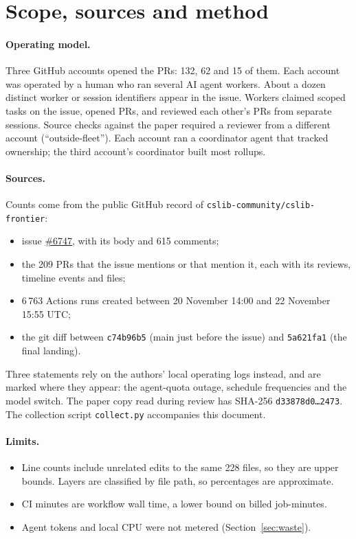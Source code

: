 \documentclass[11pt]{article}
\newcommand{\iss}[1]{\href{https://github.com/cslib-community/cslib-frontier/issues/#1}{\##1}}
\newcommand{\code}[1]{\texttt{\small #1}}
\begin{document}
\section{Scope, sources and method}

\paragraph{Operating model.} Three GitHub accounts opened the PRs: 132, 62 and 15 of them. Each
account was operated by a human who ran several AI agent workers. About a dozen distinct worker
or session identifiers appear in the issue. Workers claimed scoped tasks on the issue, opened PRs,
and reviewed each other's PRs from separate sessions. Source checks against the paper required a
reviewer from a different account (``outside-fleet''). Each account ran a coordinator
agent that tracked ownership; the third account's coordinator built most rollups.

\paragraph{Sources.} Counts come from the public GitHub record of
\code{cslib-community/cslib-frontier}:
\begin{itemize}
\item issue \iss{6747}, with its body and 615 comments;
\item the 209 PRs that the issue mentions or that mention it, each with its reviews, timeline
events and files;
\item 6\,763 Actions runs created between 20 November 14:00 and 22 November 15:55 UTC;
\item the git diff between \code{c74b96b5} (main just before the issue) and \code{5a621fa1}
(the final landing).
\end{itemize}
Three statements rely on the authors' local operating logs instead, and are marked where they
appear: the agent-quota outage, schedule frequencies and the model switch. The paper copy read
during review has SHA-256 \code{d33878d0\ldots 2473}. The collection script
\code{collect.py} accompanies this document.

\paragraph{Limits.}
\begin{itemize}
\item Line counts include unrelated edits to the same 228 files, so they are upper bounds.
Layers are classified by file path, so percentages are approximate.
\item CI minutes are workflow wall time, a lower bound on billed job-minutes.
\item Agent tokens and local CPU were not metered (Section~\ref{sec:waste}).
\end{itemize}
\end{document}
